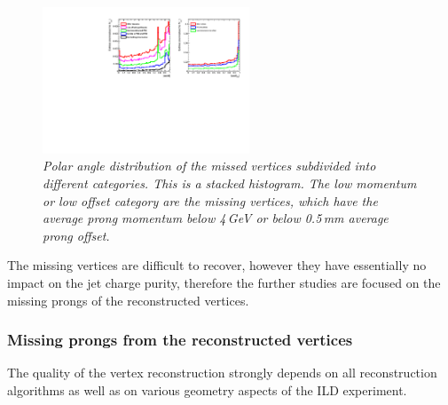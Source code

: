 \begin{figure}[h]
	{\centering
		\includegraphics[clip, trim=10.cm 0cm 0.cm 0cm, width=0.55\textwidth]{ILD/plots/missed-cos-vtx.pdf}
		\caption{\sl Polar angle distribution of the missed vertices subdivided into different categories. This is a stacked histogram. The low momentum or low offset category are the missing vertices, which have the average prong momentum below  4\,GeV or below 0.5\,mm average prong offset.
		}
		\label{fig:MissedCos_3}
	}
\end{figure}

The missing vertices are difficult to recover, however they have essentially no impact on the jet charge purity, therefore the further studies are focused on the missing prongs of the reconstructed vertices.
\subsubsection{Missing prongs from the reconstructed vertices}
\label{sec:MissingProngs}
The quality of the vertex reconstruction strongly depends on all reconstruction algorithms as well as on various geometry aspects of the ILD experiment. 

